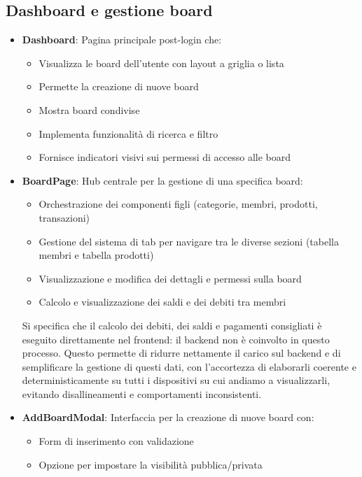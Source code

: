 \documentclass[11pt]{article}
\begin{document}
\subsection{Dashboard e gestione board}
\begin{itemize}
    \item \textbf{Dashboard}: Pagina principale post-login che:
    \begin{itemize}
        \item Visualizza le board dell'utente con layout a griglia o lista
        \item Permette la creazione di nuove board
        \item Mostra board condivise
        \item Implementa funzionalità di ricerca e filtro
        \item Fornisce indicatori visivi sui permessi di accesso alle board
    \end{itemize}

    \item \textbf{BoardPage}: Hub centrale per la gestione di una specifica board:
    \begin{itemize}
        \item Orchestrazione dei componenti figli (categorie, membri, prodotti, transazioni)
        \item Gestione del sistema di tab per navigare tra le diverse sezioni (tabella membri e tabella prodotti)
        \item Visualizzazione e modifica dei dettagli e permessi sulla board
        \item Calcolo e visualizzazione dei saldi e dei debiti tra membri
    \end{itemize}

    Si specifica che il calcolo dei debiti, dei saldi e pagamenti consigliati è eseguito direttamente nel frontend: il backend non è coinvolto in questo processo.
    Questo permette di ridurre nettamente il carico sul backend e di semplificare la gestione di questi dati, con l'accortezza di elaborarli coerente e deterministicamente su tutti i dispositivi su cui andiamo a visualizzarli, evitando disallineamenti e comportamenti inconsistenti.

    \item \textbf{AddBoardModal}: Interfaccia per la creazione di nuove board con:
    \begin{itemize}
        \item Form di inserimento con validazione
        \item Opzione per impostare la visibilità pubblica/privata
    \end{itemize}


\end{itemize}
\end{document}
